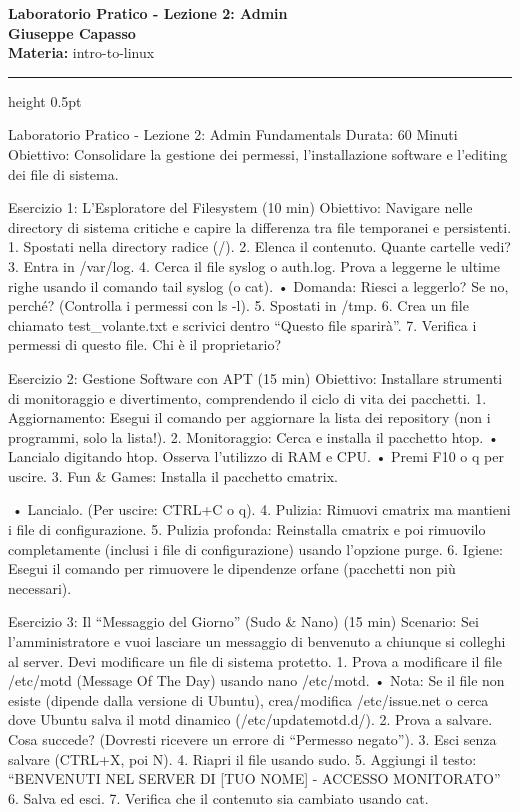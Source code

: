\documentclass[11pt,a4paper]{article}
\newcommand{\proposaltitle}[1]{
    \begin{center}
        \vspace*{0.1cm}
        {\LARGE \bfseries \color{blue} #1} \\[1.5ex]
        {\large \textbf{Giuseppe Capasso}} \\[1ex]
                \small{
            \vspace{0.1cm}
            \textbf{Materia:} intro-to-linux\\
        }
            \end{center}
    \vspace{0.3cm}
    \hrule height 0.5pt
    \vspace{0.5cm}
}
\begin{document}
\proposaltitle{Laboratorio Pratico - Lezione 2: Admin}

Laboratorio Pratico - Lezione 2: Admin Fundamentals Durata: 60 Minuti
Obiettivo: Consolidare la gestione dei permessi, l'installazione
software e l'editing dei file di sistema.

Esercizio 1: L'Esploratore del Filesystem (10 min) Obiettivo: Navigare
nelle directory di sistema critiche e capire la differenza tra file
temporanei e persistenti. 1. Spostati nella directory radice (/). 2.
Elenca il contenuto. Quante cartelle vedi? 3. Entra in /var/log. 4.
Cerca il file syslog o auth.log. Prova a leggerne le ultime righe usando
il comando tail syslog (o cat). • Domanda: Riesci a leggerlo? Se no,
perché? (Controlla i permessi con ls -l). 5. Spostati in /tmp. 6. Crea
un file chiamato test\_volante.txt e scrivici dentro ``Questo file
sparirà''. 7. Verifica i permessi di questo file. Chi è il proprietario?

Esercizio 2: Gestione Software con APT (15 min) Obiettivo: Installare
strumenti di monitoraggio e divertimento, comprendendo il ciclo di vita
dei pacchetti. 1. Aggiornamento: Esegui il comando per aggiornare la
lista dei repository (non i programmi, solo la lista!). 2. Monitoraggio:
Cerca e installa il pacchetto htop. • Lancialo digitando htop. Osserva
l'utilizzo di RAM e CPU. • Premi F10 o q per uscire. 3. Fun \& Games:
Installa il pacchetto cmatrix.

• Lancialo. (Per uscire: CTRL+C o q). 4. Pulizia: Rimuovi cmatrix ma
mantieni i file di configurazione. 5. Pulizia profonda: Reinstalla
cmatrix e poi rimuovilo completamente (inclusi i file di configurazione)
usando l'opzione purge. 6. Igiene: Esegui il comando per rimuovere le
dipendenze orfane (pacchetti non più necessari).

Esercizio 3: Il ``Messaggio del Giorno'' (Sudo \& Nano) (15 min)
Scenario: Sei l'amministratore e vuoi lasciare un messaggio di benvenuto
a chiunque si colleghi al server. Devi modificare un file di sistema
protetto. 1. Prova a modificare il file /etc/motd (Message Of The Day)
usando nano /etc/motd. • Nota: Se il file non esiste (dipende dalla
versione di Ubuntu), crea/modifica /etc/issue.net o cerca dove Ubuntu
salva il motd dinamico (/etc/updatemotd.d/). 2. Prova a salvare. Cosa
succede? (Dovresti ricevere un errore di ``Permesso negato''). 3. Esci
senza salvare (CTRL+X, poi N). 4. Riapri il file usando sudo. 5.
Aggiungi il testo: ``BENVENUTI NEL SERVER DI {[}TUO NOME{]} - ACCESSO
MONITORATO'' 6. Salva ed esci. 7. Verifica che il contenuto sia cambiato
usando cat.
\end{document}
